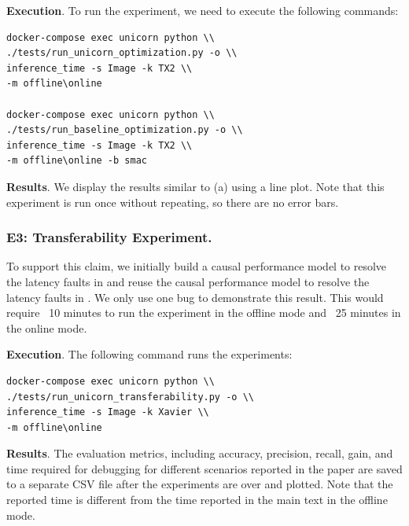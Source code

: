 \noindent \textbf{Execution}. To run the experiment, we need to execute the following commands:

\begin{verbatim}
docker-compose exec unicorn python \\ 
./tests/run_unicorn_optimization.py -o \\
inference_time -s Image -k TX2 \\
-m offline\online 
    
docker-compose exec unicorn python \\ 
./tests/run_baseline_optimization.py -o \\
inference_time -s Image -k TX2 \\
-m offline\online -b smac
\end{verbatim}

\noindent \textbf{Results}. We display the results similar to  (a) using a line plot. Note that this experiment is run once without repeating, so there are no error bars.

\subsubsection{E3: Transferability Experiment.} To support this claim, we initially build a causal performance model to resolve the latency faults in \xavier and reuse the causal performance model to resolve the latency faults in \txtwo. We only use one bug to demonstrate this result. This would require ~10 minutes to run the experiment in the offline mode and ~25 minutes in the online mode. 

\noindent \textbf{Execution}. The following command runs the experiments:

\begin{verbatim}
docker-compose exec unicorn python \\ 
./tests/run_unicorn_transferability.py -o \\
inference_time -s Image -k Xavier \\
-m offline\online 

\end{verbatim}

\noindent \textbf{Results}. The evaluation metrics, including accuracy, precision, recall, gain, and time required for debugging for different scenarios reported in the paper are saved to a separate CSV file after the experiments are over and plotted. Note that the reported time is different from the time reported in the main text in the offline mode. 

